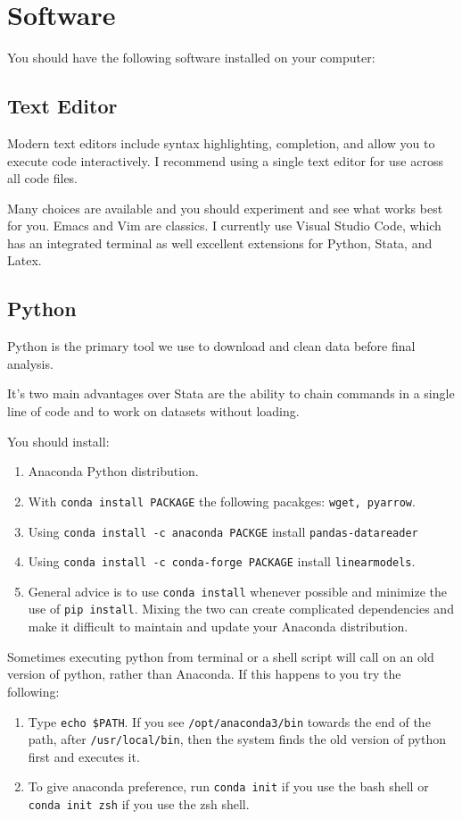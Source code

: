 \section{Software}

You should have the following software installed on your computer:

\subsection{Text Editor}

Modern text editors include syntax highlighting, completion, and allow you to execute code interactively. I recommend using a single text editor for use across all code files.

Many choices are available and you should experiment and see what works best for you. Emacs and Vim are classics. I currently use Visual Studio Code, which has an integrated terminal as well excellent extensions for Python, Stata, and Latex.

\subsection{Python}

Python is the primary tool we use to download and clean data before final analysis.

It's two main advantages over Stata are the ability to chain commands in a single line of code and to work on datasets without loading.

You should install:
\begin{enumerate}
	\item Anaconda Python distribution.
	\item With \texttt{conda install PACKAGE} the following pacakges: \texttt{wget, pyarrow}.
	\item Using \texttt{conda install -c anaconda PACKGE} install \texttt{pandas-datareader}
	\item Using \texttt{conda install -c conda-forge PACKAGE} install \texttt{linearmodels}.
	\item General advice is to use \texttt{conda install} whenever possible and minimize the use of \texttt{pip install}. Mixing the two can create complicated dependencies and make it difficult to maintain and update your Anaconda distribution.
\end{enumerate}

Sometimes executing python from terminal or a shell script will call on an old version of python, rather than Anaconda. If this happens to you try the following:
\begin{enumerate}
	\item Type \texttt{echo \$PATH}. If you see \texttt{/opt/anaconda3/bin} towards the end of the path, after \texttt{/usr/local/bin}, then the system finds the old version of python first and executes it.
	\item To give anaconda preference, run  \texttt{conda init} if you use the bash shell or \texttt{conda init zsh} if you use the zsh shell.
\end{enumerate}

